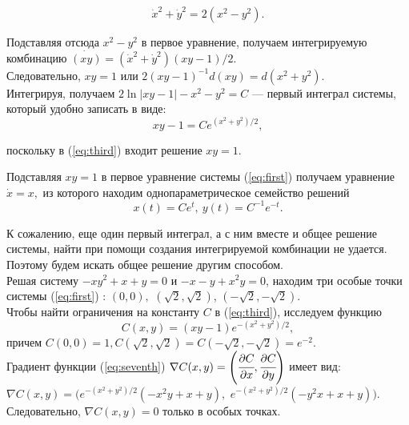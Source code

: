 \documentclass{article}
\begin{document}
\smallskip
\begin{equation}
    \dot x^2+\dot y^2=2(x^2-y^2).\label{eq:second}
\end{equation}

\smallskip
Подставляя отсюда $x^2-y^2$ в первое уравнение, получаем интегрируемую комбинацию $\dot{(xy)}=(\dot x^2+\dot y^2)(xy-1)/2.$\\

Следовательно, $xy=1$ или 
\smallskip
$2(xy-1)^{-1}d(xy)=d(x^2+y^2)$.\\

Интегрируя, получаем $ 2\ln|xy-1|-x^2-y^2=C$ --- первый интеграл системы, который удобно записать в виде:
\smallskip\noindent
\begin{equation}
    xy - 1 =C e^{(x^2+y^2)/2}, 
\label{eq:third}
\end{equation}

\noindent поскольку в (\ref{eq:third}) входит решение $xy = 1$.

Подставляя $xy=1$ в первое уравнение системы (\ref{eq:first}) получаем уравнение $\dot x=x,$ из которого находим однопараметрическое семейство решений $$x(t)=Ce^{t},\ y(t)=C^{-1}e^{-t}.$$

К сожалению, еще один первый интеграл, а с ним вместе и общее решение системы, найти при помощи создания интегрируемой комбинации не удается. Поэтому будем искать общее решение другим способом.\\

Решая систему $-xy^2+x+y = 0$ и $-x-y+x^2y = 0$,
 находим три особые точки системы (\ref{eq:first}) : $(0,0),$ $ (\sqrt{2}, \sqrt{2})$, $ (-\sqrt{2}, -\sqrt{2})$. \\

Чтобы найти ограничения на константу $C$ в (\ref{eq:third}), исследуем функцию 
\begin{equation}
            C(x,y) = (xy-1)e^{-(x^2+y^2)/2},
    \label{eq:seventh}
\end{equation}
\noindent причем $C(0,0) = 1, C(\sqrt{2},\sqrt{2}) = C(-\sqrt{2}, -\sqrt{2}) = e^{-2}.$\\

Градиент функции (\ref{eq:seventh}) $\nabla C(x,y) = \left (\cfrac{\partial C}{\partial x}, \cfrac{\partial C}{\partial y} \right)$ имеет вид:\\$ \nabla C(x,y) = (e^{-(x^2+y^2)/2}(-x^2y + x + y),$ $ e^{-(x^2+y^2)/2}(-y^2x + x + y))$.\\

Следовательно, $\nabla C(x,y)=0$ только в особых точках.\\
\end{document}
